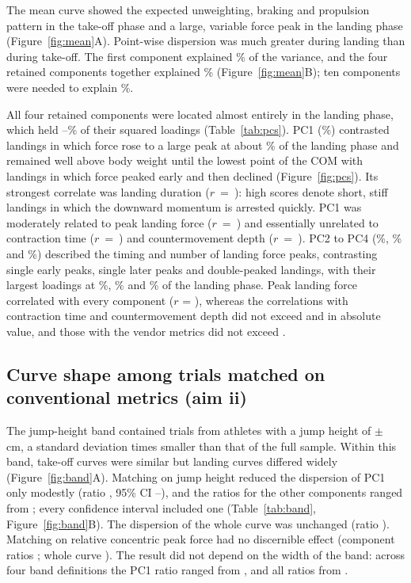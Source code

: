 The mean curve showed the expected unweighting, braking and propulsion pattern in the take-off phase and a large, variable force peak in the landing phase (Figure~\ref{fig:mean}A). Point-wise dispersion was much greater during landing than during take-off. The first component explained \varPCA\% of the variance, and the four retained components together explained \cumFour\% (Figure~\ref{fig:mean}B); ten components were needed to explain \cumTen\%.



All four retained components were located almost entirely in the landing phase, which held \ldsPCD--\ldsPCB\% of their squared loadings (Table~\ref{tab:pcs}). PC1 (\varPCA\%) contrasted landings in which force rose to a large peak at about \peakPCA\% of the landing phase and remained well above body weight until the lowest point of the COM with landings in which force peaked early and then declined (Figure~\ref{fig:pcs}). Its strongest correlate was landing duration ($r$~=~\rLdPCA): high scores denote short, stiff landings in which the downward momentum is arrested quickly. PC1 was moderately related to peak landing force ($r$~=~\rLpfPCA) and essentially unrelated to contraction time ($r$~=~\rCtPCA) and countermovement depth ($r$~=~\rCmdPCA). PC2 to PC4 (\varPCB\%, \varPCC\% and \varPCD\%) described the timing and number of landing force peaks, contrasting single early peaks, single later peaks and double-peaked landings, with their largest loadings at \peakPCB\%, \peakPCC\% and \peakPCD\% of the landing phase. Peak landing force correlated with every component ($r$ = \lpfCorRange), whereas the correlations with contraction time and countermovement depth did not exceed \ctAbsMax{} and \cmdAbsMax{} in absolute value, and those with the vendor metrics did not exceed \vendorAbsMax.




\subsection{Curve shape among trials matched on conventional metrics (aim ii)}

The jump-height band contained \jhBandN{} trials from \jhBandAth{} athletes with a jump height of \jhBandMean{} $\pm$ \jhBandSD{}\,cm, a standard deviation \jhBandSDfactor{} times smaller than that of the full sample. Within this band, take-off curves were similar but landing curves differed widely (Figure~\ref{fig:band}A). Matching on jump height reduced the dispersion of PC1 only modestly (ratio \jhRatioPCA, 95\% CI \jhLoPCA--\jhHiPCA), and the ratios for the other components ranged from \jhRatioOtherRange; every confidence interval included one (Table~\ref{tab:band}, Figure~\ref{fig:band}B). The dispersion of the whole curve was unchanged (ratio \wholeJh). Matching on relative concentric peak force had no discernible effect (component ratios \rpfRatioRange; whole curve \wholeRpf). The result did not depend on the width of the band: across four band definitions the PC1 ratio ranged from \bwPCARange, and all ratios from \bwAllRange.

